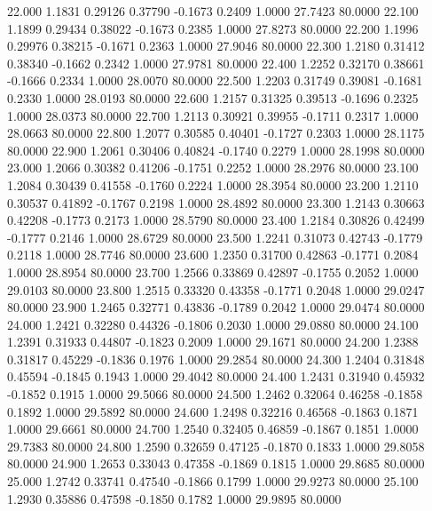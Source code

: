   22.000   1.1831   0.29126   0.37790  -0.1673   0.2409   1.0000  27.7423  80.0000
  22.100   1.1899   0.29434   0.38022  -0.1673   0.2385   1.0000  27.8273  80.0000
  22.200   1.1996   0.29976   0.38215  -0.1671   0.2363   1.0000  27.9046  80.0000
  22.300   1.2180   0.31412   0.38340  -0.1662   0.2342   1.0000  27.9781  80.0000
  22.400   1.2252   0.32170   0.38661  -0.1666   0.2334   1.0000  28.0070  80.0000
  22.500   1.2203   0.31749   0.39081  -0.1681   0.2330   1.0000  28.0193  80.0000
  22.600   1.2157   0.31325   0.39513  -0.1696   0.2325   1.0000  28.0373  80.0000
  22.700   1.2113   0.30921   0.39955  -0.1711   0.2317   1.0000  28.0663  80.0000
  22.800   1.2077   0.30585   0.40401  -0.1727   0.2303   1.0000  28.1175  80.0000
  22.900   1.2061   0.30406   0.40824  -0.1740   0.2279   1.0000  28.1998  80.0000
  23.000   1.2066   0.30382   0.41206  -0.1751   0.2252   1.0000  28.2976  80.0000
  23.100   1.2084   0.30439   0.41558  -0.1760   0.2224   1.0000  28.3954  80.0000
  23.200   1.2110   0.30537   0.41892  -0.1767   0.2198   1.0000  28.4892  80.0000
  23.300   1.2143   0.30663   0.42208  -0.1773   0.2173   1.0000  28.5790  80.0000
  23.400   1.2184   0.30826   0.42499  -0.1777   0.2146   1.0000  28.6729  80.0000
  23.500   1.2241   0.31073   0.42743  -0.1779   0.2118   1.0000  28.7746  80.0000
  23.600   1.2350   0.31700   0.42863  -0.1771   0.2084   1.0000  28.8954  80.0000
  23.700   1.2566   0.33869   0.42897  -0.1755   0.2052   1.0000  29.0103  80.0000
  23.800   1.2515   0.33320   0.43358  -0.1771   0.2048   1.0000  29.0247  80.0000
  23.900   1.2465   0.32771   0.43836  -0.1789   0.2042   1.0000  29.0474  80.0000
  24.000   1.2421   0.32280   0.44326  -0.1806   0.2030   1.0000  29.0880  80.0000
  24.100   1.2391   0.31933   0.44807  -0.1823   0.2009   1.0000  29.1671  80.0000
  24.200   1.2388   0.31817   0.45229  -0.1836   0.1976   1.0000  29.2854  80.0000
  24.300   1.2404   0.31848   0.45594  -0.1845   0.1943   1.0000  29.4042  80.0000
  24.400   1.2431   0.31940   0.45932  -0.1852   0.1915   1.0000  29.5066  80.0000
  24.500   1.2462   0.32064   0.46258  -0.1858   0.1892   1.0000  29.5892  80.0000
  24.600   1.2498   0.32216   0.46568  -0.1863   0.1871   1.0000  29.6661  80.0000
  24.700   1.2540   0.32405   0.46859  -0.1867   0.1851   1.0000  29.7383  80.0000
  24.800   1.2590   0.32659   0.47125  -0.1870   0.1833   1.0000  29.8058  80.0000
  24.900   1.2653   0.33043   0.47358  -0.1869   0.1815   1.0000  29.8685  80.0000
  25.000   1.2742   0.33741   0.47540  -0.1866   0.1799   1.0000  29.9273  80.0000
  25.100   1.2930   0.35886   0.47598  -0.1850   0.1782   1.0000  29.9895  80.0000
